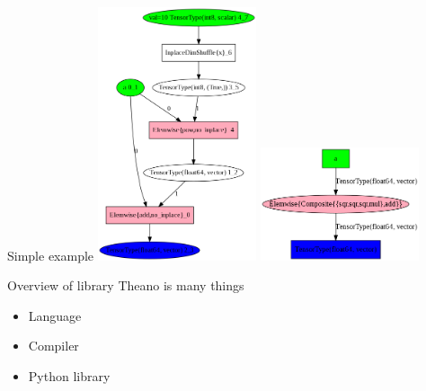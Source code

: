 \documentclass[utf8x,xcolor=pdftex,dvipsnames,table]{beamer}
\begin{document}
\begin{frame}{Simple example}
\center
\includegraphics[width=0.35\textwidth]{pics/f_unoptimized.png}
\hspace{0.1\textwidth}
\includegraphics[width=0.35\textwidth]{pics/f_optimized.png}
\end{frame}


\begin{frame}{Overview of library}
  Theano is many things
  \begin{itemize}
  \item Language
  \item Compiler
  \item Python library
  \end{itemize}
\end{frame}

\end{document}
